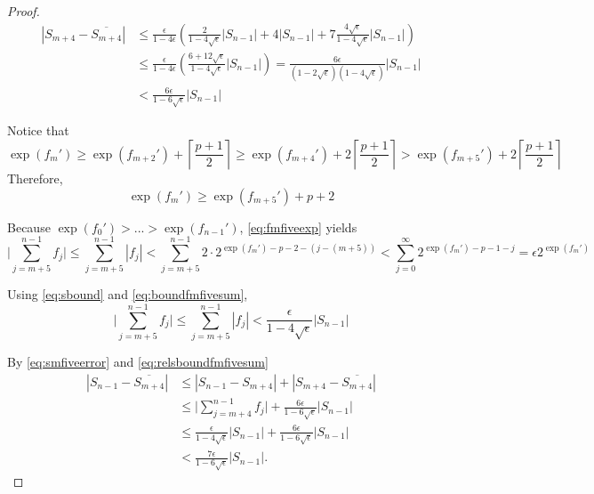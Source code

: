 \begin{proof}
      \begin{align}
      \left|S_{m+4} - \overline{S_{m+4}}\right|
          & \leq \frac{\epsilon}{1-4\epsilon}
              \left(
                  \frac{2}{1-4\sqrt{\epsilon}} |S_{n-1}|
                  + 4 |S_{n-1}|
                  + 7 \frac{4\sqrt{\epsilon}}{1-4\sqrt{\epsilon}} |S_{n-1}|
              \right) \nonumber \\
          & \leq \frac{\epsilon}{1-4\epsilon} \left(\frac{6+12\sqrt{\epsilon}}{1-4\sqrt{\epsilon}} |S_{n-1}|\right)
              = \frac{6\epsilon }{(1-2\sqrt{\epsilon})(1-4\sqrt{\epsilon})} |S_{n-1}| \nonumber \\
          & < \frac{6\epsilon}{1-6\sqrt{\epsilon}} |S_{n-1}|
          \label{eq:smfiveerror}
      \end{align}

      Notice that
      \begin{equation*}
        \exp(f_m') \geq \exp(f_{m + 2}') + \left\lceil\frac{p+ 1}{2}\right\rceil \geq \exp(f_{m + 4}') + 2  \left\lceil\frac{p + 1}{2}\right\rceil > \exp(f_{m + 5}')+ 2  \left\lceil\frac{p+ 1}{2}\right\rceil
      \end{equation*}
      Therefore,
      \begin{equation}
        \exp(f_m') \geq \exp(f_{m + 5}') + p + 2
        \label{eq:fmfiveexp}
      \end{equation}

      Because $\exp(f_0') > ... > \exp(f_{n - 1}')$, \eqref{eq:fmfiveexp} yields
      \begin{equation}
        \bigl|\sum\limits_{j = m + 5}^{n - 1} f_j\bigr| \leq \sum\limits_{j = m + 5}^{n - 1} |f_j| < \sum\limits_{j = m + 5}^{n - 1} 2 \cdot 2^{\exp(f_m') - p - 2 - (j - (m + 5))} < \sum\limits_{j = 0}^{\infty} 2^{\exp(f_m') - p - 1 - j} = \epsilon 2^{\exp(f_m')}
        \label{eq:boundfmfivesum}
      \end{equation}

      Using \eqref{eq:sbound} and \eqref{eq:boundfmfivesum},
      \begin{equation}
        \bigl|\sum\limits_{j = m + 5}^{n - 1} f_j\bigr| \leq \sum\limits_{j = m + 5}^{n - 1} |f_j| < \frac{\epsilon}{1 - 4  \sqrt\epsilon}|S_{n - 1}|
        \label{eq:relsboundfmfivesum}
      \end{equation}

      By \eqref{eq:smfiveerror} and \eqref{eq:relsboundfmfivesum}
      \begin{align}
        \left|S_{n-1} - \overline{S_{m+4}}\right|
        & \leq |S_{n-1} - S_{m+4}| + \left|S_{m+4} - \overline{S_{m+4}}\right| \nonumber \\
        & \leq \bigl|\sum_{j=m+4}^{n-1} f_j\bigr| + \frac{6\epsilon}{1-6\sqrt{\epsilon}} |S_{n-1}| \nonumber \\
        & \leq \frac{\epsilon}{1 - 4 \sqrt\epsilon}|S_{n-1}| + \frac{6\epsilon}{1-6\sqrt{\epsilon}} |S_{n-1}| \nonumber \\
        & <  \frac{7\epsilon}{1-6\sqrt{\epsilon}} |S_{n-1}|.
        \label{eq:smfiveerror-1}
      \end{align}


\end{proof}
